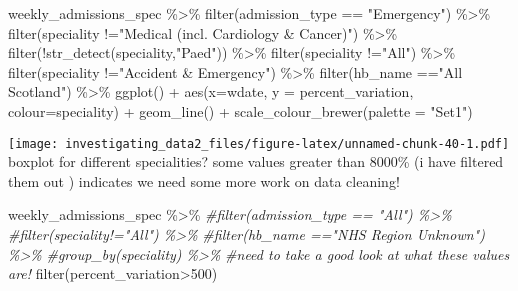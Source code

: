 \documentclass[
]{article}
\newenvironment{Shaded}{\begin{snugshade}}{\end{snugshade}}
\newcommand{\AttributeTok}[1]{\textcolor[rgb]{0.77,0.63,0.00}{#1}}
\newcommand{\CommentTok}[1]{\textcolor[rgb]{0.56,0.35,0.01}{\textit{#1}}}
\newcommand{\DecValTok}[1]{\textcolor[rgb]{0.00,0.00,0.81}{#1}}
\newcommand{\FunctionTok}[1]{\textcolor[rgb]{0.00,0.00,0.00}{#1}}
\newcommand{\NormalTok}[1]{#1}
\newcommand{\SpecialCharTok}[1]{\textcolor[rgb]{0.00,0.00,0.00}{#1}}
\newcommand{\StringTok}[1]{\textcolor[rgb]{0.31,0.60,0.02}{#1}}
\begin{document}
\begin{Shaded}
\begin{Highlighting}[]
\NormalTok{weekly\_admissions\_spec }\SpecialCharTok{\%\textgreater{}\%} 
  \FunctionTok{filter}\NormalTok{(admission\_type }\SpecialCharTok{==} \StringTok{"Emergency"}\NormalTok{) }\SpecialCharTok{\%\textgreater{}\%} 
  \FunctionTok{filter}\NormalTok{(speciality }\SpecialCharTok{!=}\StringTok{"Medical (incl. Cardiology \& Cancer)"}\NormalTok{) }\SpecialCharTok{\%\textgreater{}\%} 
  \FunctionTok{filter}\NormalTok{(}\SpecialCharTok{!}\FunctionTok{str\_detect}\NormalTok{(speciality,}\StringTok{"Paed"}\NormalTok{)) }\SpecialCharTok{\%\textgreater{}\%} 
  \FunctionTok{filter}\NormalTok{(speciality }\SpecialCharTok{!=}\StringTok{"All"}\NormalTok{) }\SpecialCharTok{\%\textgreater{}\%} 
  \FunctionTok{filter}\NormalTok{(speciality }\SpecialCharTok{!=}\StringTok{"Accident \& Emergency"}\NormalTok{) }\SpecialCharTok{\%\textgreater{}\%} 
  \FunctionTok{filter}\NormalTok{(hb\_name }\SpecialCharTok{==}\StringTok{"All Scotland"}\NormalTok{) }\SpecialCharTok{\%\textgreater{}\%} 
\FunctionTok{ggplot}\NormalTok{() }\SpecialCharTok{+}
\FunctionTok{aes}\NormalTok{(}\AttributeTok{x=}\NormalTok{wdate, }\AttributeTok{y =}\NormalTok{ percent\_variation, }\AttributeTok{colour=}\NormalTok{speciality) }\SpecialCharTok{+}
\FunctionTok{geom\_line}\NormalTok{() }\SpecialCharTok{+}
\FunctionTok{scale\_colour\_brewer}\NormalTok{(}\AttributeTok{palette =} \StringTok{"Set1"}\NormalTok{) }
\end{Highlighting}
\end{Shaded}

\texttt{[image: investigating\_data2\_files/figure-latex/unnamed-chunk-40-1.pdf]}
boxplot for different specialities? some values greater than 8000\% (i
have filtered them out ) indicates we need some more work on data
cleaning!

\begin{Shaded}
\begin{Highlighting}[]
\NormalTok{weekly\_admissions\_spec }\SpecialCharTok{\%\textgreater{}\%} 
  \CommentTok{\#filter(admission\_type == "All") \%\textgreater{}\% }
  \CommentTok{\#filter(speciality!="All") \%\textgreater{}\% }
  \CommentTok{\#filter(hb\_name =="NHS Region Unknown") \%\textgreater{}\% }
  \CommentTok{\#group\_by(speciality) \%\textgreater{}\% }
  \CommentTok{\#need to take a good look at what these values are!}
  \FunctionTok{filter}\NormalTok{(percent\_variation}\SpecialCharTok{\textgreater{}}\DecValTok{500}\NormalTok{) }
\end{Highlighting}
\end{Shaded}
\end{document}
